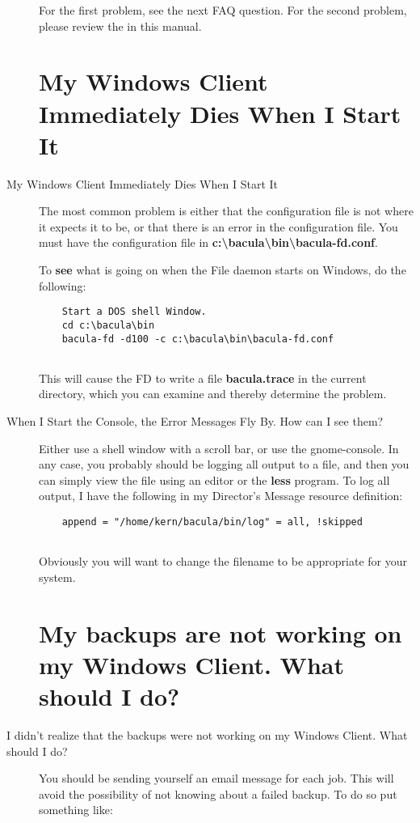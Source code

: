 \begin{description}
   For the first problem, see the next FAQ question.  For the second
   problem, please review the  in this manual.

\label{windowsdie}
\section{My Windows Client Immediately Dies When I Start It}
\item [My Windows Client Immediately Dies When I Start It]
The most common problem is either that the configuration file is not where
it expects it to be, or that there is an error in the configuration file.
You must have the configuration file in {\bf
c:\textbackslash{}bacula\textbackslash{}bin\textbackslash{}bacula-fd.conf}.

To {\bf see} what is going on when the File daemon starts  on Windows, do the
following:  

\footnotesize
\begin{verbatim}
    Start a DOS shell Window.
    cd c:\bacula\bin
    bacula-fd -d100 -c c:\bacula\bin\bacula-fd.conf
    
\end{verbatim}
\normalsize

This will cause the FD to write a file {\bf bacula.trace}  in the current
directory, which you can examine and thereby determine  the problem.  

\label{scroll}
\item [When I Start the Console, the Error Messages Fly By. How can I see
   them? ]
   Either use a shell window with a scroll bar, or use the gnome-console.
   In any case, you probably should be logging all output to a file, and
   then you can simply view the file using an editor or the {\bf less}
   program.  To log all output, I have the following in my Director's
   Message resource definition:

\footnotesize
\begin{verbatim}
    append = "/home/kern/bacula/bin/log" = all, !skipped
    
\end{verbatim}
\normalsize

Obviously you will want to change the filename to be appropriate  for your
system.  

\label{nobackup}
\section{My backups are not working on my Windows 
   Client. What should I do?}
\item [I didn't realize that the backups were not working on my Windows 
   Client. What should I do? ]
You should be sending yourself an email message for each job. This will  avoid
the possibility of not knowing about a failed backup. To do so  put something
like:  


\end{description}
